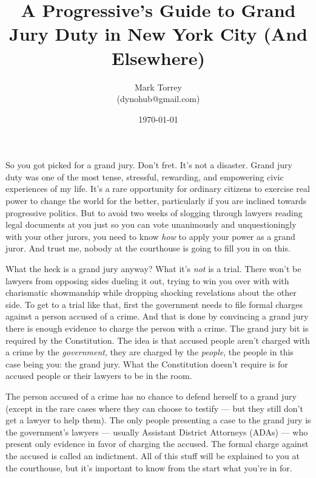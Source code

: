 \documentclass[letterpaper]{article}
\begin{document}
\title{A Progressive's Guide to Grand Jury Duty in New York City (And Elsewhere)}
\author{Mark Torrey\\ (dynohub@gmail.com)}
\date{\today}
\maketitle




So you got picked for a grand jury.
Don't fret. It's not a disaster.
Grand jury duty was one of the most tense, stressful, rewarding, and empowering civic experiences of my life.
It's a rare opportunity for ordinary citizens to exercise real power to change the world for the better, particularly if you are inclined towards progressive politics.
But to avoid two weeks of slogging through lawyers reading legal documents at you just so you can vote unanimously and unquestioningly with your other jurors, you need to know \emph{how} to apply your power as a grand juror.
And trust me, nobody at the courthouse is going to fill you in on this.

What the heck is a grand jury anyway? 
What it's \emph{not} is a trial.
There won't be lawyers from opposing sides dueling it out, trying to win you over with with charismatic showmanship while dropping shocking revelations about the other side. 
To get to a trial like that, first the government needs to file formal charges against a person accused of a crime. 
And that is done by convincing a grand jury there is enough evidence to charge the person with a crime. 
The grand jury bit is required by the Constitution.
The idea is that accused people aren't charged with a crime by the \emph{government}, they are charged by the \emph{people}, the people in this case being you: the grand jury.
What the Constitution doesn't require is for accused people or their lawyers to be in the room.

The person accused of a crime has no chance to defend herself to a grand jury (except in the rare cases where they can choose to testify --- but they still don't get a lawyer to help them).
The only people presenting a case to the grand jury is the government's lawyers --- usually Assistant District Attorneys (ADAs) --- who present only evidence in favor of charging the accused.
The formal charge against the accused is called an indictment.
All of this stuff will be explained to you at the courthouse, but it's important to know from the start what you're in for.
\end{document}
